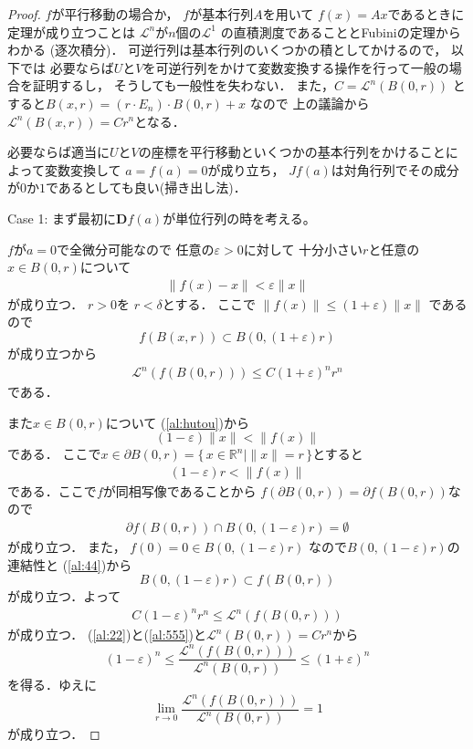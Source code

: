 \documentclass[leqno, a4paper, 12pt]{jsarticle}
\newcommand{\rr}{\mathbb{R}}
\newcommand{\ep}{\varepsilon}
\newcommand{\ddd}{\mathbf{D}}
\begin{document}
\begin{proof}
$f$が平行移動の場合か，
$f$が基本行列$A$を用いて
$f(x)=Ax$であるときに定理が成り立つことは
$\mathcal{L}^{n}$が$n$個の$\mathcal{L}^{1}$
の直積測度であることとFubiniの定理からわかる
 (逐次積分)．
 可逆行列は基本行列のいくつかの積としてかけるので，
 以下では
 必要ならば$U$と$V$を可逆行列をかけて変数変換する操作を行って一般の場合を証明するし，
 そうしても一般性を失わない．
 また，$C=\mathcal{L}^{n}(B(0, r))$
 とすると$B(x, r)=(r\cdot E_{n})\cdot B(0, r)+x$
 なので
 上の議論から
 $\mathcal{L}^{n}(B(x, r))=Cr^{n}$となる．
 
必要ならば適当に$U$と$V$の座標を平行移動といくつかの基本行列をかけることによって変数変換して
$a=f(a)=0$が成り立ち，
$Jf(a)$は対角行列でその成分が$0$か$1$であるとしても良い(掃き出し法)．


Case 1: まず最初に$\ddd f(a)$が単位行列の時を考える。

$f$が$a=0$で全微分可能なので
任意の$\ep>0$に対して
十分小さい$r$と任意の$x\in B(0, r)$について
\begin{align}\label{al:hutou}
\|f(x)-x\|<\ep \|x\|
\end{align}
が成り立つ．
$r>0$を
$r<\delta$とする．
ここで
$\|f(x)\|\le (1+\ep)\|x\|$
であるので
\[
f(B(x,r))\subset B(0, (1+\ep)r)
\]
が成り立つから
\begin{align}\label{al:22}
\mathcal{L}^{n}(f(B(0, r)))\le C(1+\ep)^{n}r^{n}
\end{align}
である．

また$x\in B(0, r)$について (\ref{al:hutou})から
\[
(1-\ep)\|x\|< \|f(x)\|
\]
である．
ここで$x\in \partial B(0, r)=
\{\, x\in \rr^{n}\mid \|x\|=r\, \}$とすると
\begin{align}\label{al:333}
(1-\ep)r<\|f(x)\|
\end{align}
である．ここで$f$が同相写像であることから
$f(\partial B(0, r))=\partial f(B(0, r))$なので
\begin{align}\label{al:44}
\partial f(B(0,r))\cap B(0,(1-\ep)r)=\emptyset
\end{align}
が成り立つ．
また，
$f(0)=0\in B(0,(1-\ep)r)$
なので$B(0,(1-\ep)r)$の連結性と (\ref{al:44})から
\[
B(0,(1-\ep)r)\subset f(B(0,r))
\]
が成り立つ．よって
\begin{align}\label{al:555}
C(1-\ep)^{n}r^{n}\le \mathcal{L}^{n}(f(B(0,r)))
\end{align}
が成り立つ．
(\ref{al:22})と(\ref{al:555})と$\mathcal{L}^{n}(B(0,r))=Cr^{n}$から
\[
(1-\ep)^n\le \frac{\mathcal{L}^{n}(f(B(0,r)))}
{\mathcal{L}^{n}(B(0,r))}\le (1+\ep)^n
\]
を得る．ゆえに
\[
\lim_{r\to 0}\frac{\mathcal{L}^{n}(f(B(0,r)))}{\mathcal{L}^{n}(B(0,r))}=1
\]
が成り立つ．


\end{proof}
\end{document}
